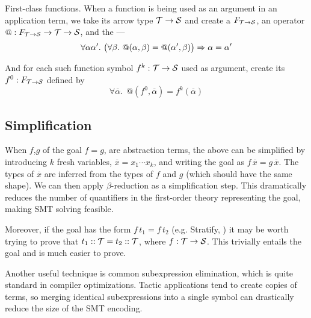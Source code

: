 \begin{paragraph}{First-class functions.}
When a function is being used as an argument in an application term, 
we take its arrow type $\mathcal{T}\to\mathcal{S}$ and create a  $F_{\mathcal{T}\to\mathcal{S}}$,
an operator $@ : F_{\mathcal{T}\to\mathcal{S}}\to\mathcal{T}\to\mathcal{S}$, and the  ---
\begin{equation}
\forall \alpha\alpha'.~ \big(\forall\beta.~ @(\alpha,\beta)=@(\alpha',\beta)\big)\Rightarrow \alpha=\alpha'
\label{automated:extensionality}
\end{equation}

And for each such function symbol $f^k:\mathcal{T}\to\mathcal{S}$ used as argument, create its 
 $f^0:F_{\mathcal{T}\to\mathcal{S}}$ defined by
\begin{equation}
\forall \overline\alpha.~~@(f^0,\overline\alpha)=f^k(\overline\alpha)
\label{automated:reflection}
\end{equation}
\end{paragraph}

\vspace{-8mm}
\subsection{Simplification}

When $f$,$g$ of the goal $f=g$, are abstraction terms, the above can be simplified by
introducing $k$ fresh variables, $\overline x=x_1\cdots x_k$, and writing the goal as
$f\,\overline x = g\,\overline x$. The types of $\overline x$ are inferred from the types
of $f$ and $g$ (which should have the same shape). We can then apply $\beta$-reduction as
a simplification step. This dramatically reduces the number of quantifiers in the first-order
theory representing the goal, making SMT solving feasible.

Moreover, if the goal has the form $f\,t_1 = f\,t_2$ (e.g. {\sf Stratify}, ) it may
be worth trying to prove that $t_1::\mathcal{T} = t_2::\mathcal{T}$, where $f:\mathcal{T}\to\mathcal{S}$.
This trivially entails the goal and is much easier to prove. 

Another useful technique is common subexpression elimination, which is quite standard
in compiler optimizations. Tactic applications tend to create copies of terms, so
merging identical subexpressions into a single symbol can drastically reduce the size
of the SMT encoding.
